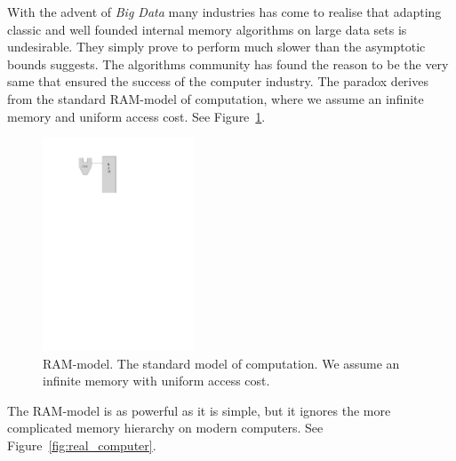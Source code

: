 \documentclass[twoside,11pt,openright]{report}
\begin{document}
With the advent of \textit{Big Data} many industries has come to realise that adapting classic and well founded internal memory algorithms on large data sets is undesirable. 
They simply prove to perform much slower than the asymptotic bounds suggests. The algorithms community has found the reason to be the very same that ensured the success of the computer industry. The paradox derives from the standard RAM-model of computation, where we assume an infinite memory and uniform access cost. See Figure~\ref{fig:ram_model}.

\begin{figure}
\captionsetup{width=0.40\textwidth}
	\centering
		\includegraphics[width=0.4\textwidth]{../figures/ram_model}
	\caption{RAM-model. The standard model of computation. We assume an infinite memory with uniform access cost.}
	\label{fig:ram_model}
\end{figure}

The RAM-model is as powerful as it is simple, but it ignores the more complicated memory hierarchy on modern computers. See Figure~\ref{fig:real_computer}. 
\end{document}
